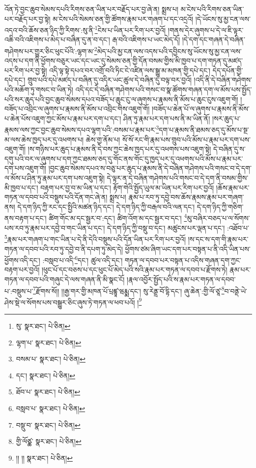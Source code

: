 འོན་ཏེ་བྱང་ཆུབ་སེམས་དཔའི་རིགས་ཅན་ཡིན་པར་བརྗོད་པར་བྱ་ཞེ་ན། སྨྲས་པ། མ་ངེས་པའི་རིགས་ཅན་ཡིན་པར་བརྗོད་པར་བྱ་སྟེ། མ་ངེས་པའི་སེམས་ཅན་གྱི་ཚོགས་རྣམ་པར་གཞག་པ་དང་འདྲའོ། །དེ་ཡོངས་སུ་མྱ་ངན་ལས་འདའ་བའི་ཆོས་ཅན་ཉིད་ཀྱི་རིགས་:སུ་ནི་\footnote{སུ་  སྣར་ཐང་།  པེ་ཅིན། }ངེས་པ་ཡིན་པར་རིག་པར་བྱའོ། །གནས་དེར་ཞུགས་པ་དེ་ལ་ཇི་ལྟར་འཆི་བའི་འཇིགས་པ་མེད་པ་བཞིན་དུ་ན་བ་དང་། རྒ་བའི་འཇིགས་པ་ཡང་མེད་དོ། །དེ་དག་དང་གཞན་དེ་བཞིན་གཤེགས་པར་གྱུར་ཅིང་ཕུང་པོའི་:ལྷག་མ་\footnote{ལྷག་པ་  སྣར་ཐང་།  པེ་ཅིན། }མེད་པའི་མྱ་ངན་ལས་འདས་པའི་དབྱིངས་སུ་ཡོངས་སུ་མྱ་ངན་ལས་འདས་པ་དག་ནི་ཕྱོགས་བཅུར་ཡང་དང་ཡང་དུ་སེམས་ཅན་གྱི་དོན་བསམ་གྱིས་མི་ཁྱབ་པ་དག་གཏན་དུ་མཛད་པར་རིག་པར་བྱ་སྟེ། འདི་ལྟ་སྟེ་དཔའ་བར་འགྲོ་བའི་ཏིང་ངེ་འཛིན་ལས་སྒྱུ་མ་མཁན་གྱི་དཔེ་དང་། དེད་དཔོན་གྱི་དཔེ་དང་། གྲུབ་པའི་དཔེ་མཛད་པ་བཞིན་དུ་འདིར་ཡང་ཚུལ་དེ་བཞིན་དུ་བལྟ་བར་བྱའོ། །འདི་ནི་དེ་བཞིན་གཤེགས་པའི་མཆོག་ཏུ་གསང་བ་ཡིན་ཏེ། འདི་དང་དེ་བཞིན་གཤེགས་པའི་གསང་བ་སྣ་ཚོགས་གཞན་དག་ལ་མོས་པས་སྤྱོད་པའི་སར་ཆུད་པའི་བྱང་ཆུབ་སེམས་དཔའ་བཟོད་པ་ཆུང་ངུ་ལ་ཞུགས་པ་རྣམས་ནི་མོས་པ་ཆུང་ངུས་འཇུག་གོ། །བཟོད་པ་འབྲིང་ལ་ཞུགས་པ་རྣམས་ནི་མོས་པ་འབྲིང་གིས་འཇུག་གོ། །བཟོད་པ་ཆེན་པོ་ལ་ཞུགས་པ་རྣམས་ནི་མོས་པ་ཆེན་པོས་འཇུག་ཀྱང་མོས་པ་རྣམ་པར་དག་པ་དང་། ཤིན་ཏུ་རྣམ་པར་དག་པས་ནི་མ་ཡིན་ནོ། །སར་ཆུད་པ་རྣམས་ལས་ཀྱང་བྱང་ཆུབ་སེམས་དཔའ་ལྷག་པའི་:བསམ་པ་རྣམ་པར་\footnote{བསམ་པ་  སྣར་ཐང་།  པེ་ཅིན། }དག་པ་རྣམས་ནི་ཐམས་ཅད་དུ་མོས་པ་སྔ་མ་ལས་ཆེས་ཁྱད་པར་དུ་འཕགས་པ། ཆེས་གྱ་ནོམ་པ། སོ་སོ་རང་གི་རྣམ་པས་གྲུབ་པའི་མོས་པ་རྣམ་པར་དག་པས་འཇུག་གོ། །ས་གཉིས་པར་ཆུད་པ་རྣམས་ནི་དེ་བས་ཀྱང་ཆེས་ཁྱད་པར་དུ་འཕགས་པས་འཇུག་སྟེ། དེ་བཞིན་དུ་ས་དགུ་པའི་བར་ལ་ཞུགས་པ་དག་ཀྱང་ཐམས་ཅད་དུ་གོང་ནས་གོང་དུ་ཁྱད་པར་དུ་འཕགས་པའི་མོས་པ་རྣམ་པར་དག་པས་འཇུག་གོ། །བྱང་ཆུབ་སེམས་དཔའ་ས་བཅུ་པར་ཆུད་པ་རྣམས་ནི་དེ་བཞིན་གཤེགས་པའི་གསང་བ་དེ་དག་ལ་མོས་པ་ཤིན་ཏུ་རྣམ་པར་དག་པས་འཇུག་སྟེ། དེ་ལྟར་ན་དེ་བཞིན་གཤེགས་པའི་གསང་བ་དེ་དག་ནི་བསམ་གྱིས་མི་ཁྱབ་པ་དང་། བརྟག་པར་བྱ་བ་མ་ཡིན་པ་དང་། རྟོག་གེའི་སྤྱོད་ཡུལ་མ་ཡིན་པར་རིག་པར་བྱའོ། །ཆོས་རྣམ་པར་གཏན་ལ་དབབ་པའི་བསྡུས་པའི་དོན་གང་ཞེ་ན། སྨྲས་པ། རྣམ་པ་རབ་ཏུ་དབྱེ་བས་ཆོས་རྣམས་རྣམ་པར་གཞག་ནས། དེ་དག་ཉིད་ཀྱི་རང་དང་སྤྱིའི་མཚན་ཉིད་དང་། དེ་དག་ཉིད་ཀྱི་བརྒལ་བའི་ལན་དང་། དེ་དག་ཉིད་ཀྱི་གཅིག་ནས་བརྟག་པ་དང་། ཚིག་གོང་མ་དང་སྦྱར་བ་:དང་། ཚིག་འོག་མ་དང་སྦྱར་བ་དང་། \footnote{དང་།    སྣར་ཐང་།  པེ་ཅིན། }མུ་བཞིར་བཅད་པ་ལ་སོགས་པས་རབ་ཏུ་རྣམ་པར་དབྱེ་བ་གང་ཡིན་པ་དང་། དེ་དག་ཉིད་ཀྱི་བསྡུ་བ་དང་། མཚུངས་པར་ལྡན་པ་དང་། :འཐོབ་པ་\footnote{ཐོབ་པ་  སྣར་ཐང་།  པེ་ཅིན། }རྣམ་པར་གཞག་པ་གང་ཡིན་པ་དེ་ནི་དེའི་བསྡུས་པའི་དོན་ཡིན་པར་རིག་པར་བྱའོ། །ས་དང་ས་དག་གི་རྣམ་པར་གཏན་ལ་དབབ་པའི་རབ་ཏུ་དབྱེ་བ་ནི་དཔག་ཏུ་མེད་དེ། ཕྱོགས་ཙམ་ཞིག་ཡང་དག་པར་བསྟན་པ་ནི་འདི་ཡིན་པས་ཕྱོགས་འདི་དང་། :བསླབ་པ་འདི་\footnote{བསླབ་པ་  སྣར་ཐང་།  པེ་ཅིན། }དང་། ཚུལ་འདི་དང་། གཏན་ལ་དབབ་པར་བསྟན་པ་འདིས་གཞན་དག་ཀྱང་བརྟག་པར་བྱའོ། །ཕུང་པོ་དང་བཅས་པ་དང་ཕུང་པོ་མེད་པའི་སའི་རྣམ་པར་གཏན་ལ་དབབ་པ་རྫོགས་ཏེ། རྣམ་པར་གཏན་ལ་དབབ་པའི་གཞུང་དེ་ལས་གཞན་ནི་མི་སྣང་ངོ། །རྣལ་འབྱོར་སྤྱོད་པའི་ས་རྣམ་པར་གཏན་ལ་དབབ་པ་:བསྡུས་པ་\footnote{བསྡུ་བ་  སྣར་ཐང་།  པེ་ཅིན། }རྫོགས་སོ།། །།རྒྱ་གར་གྱི་མཁན་པོ་པྲཛྙཱ་ཝརྨྨ་དང་། སུ་རེནྡྲ་བོ་དྷི་དང་། ཞུ་ཆེན་:གྱི་ལོ་ཙཱ་\footnote{གྱི་ལོཙྪ་  སྣར་ཐང་།  པེ་ཅིན། }བ་བནྡེ་ཡེ་ཤེས་སྡེ་ལ་སོགས་པས་བསྒྱུར་ཅིང་ཞུས་ཏེ་གཏན་ལ་ཕབ་པའོ། །\footnote{།། །།  སྣར་ཐང་།  པེ་ཅིན། }
